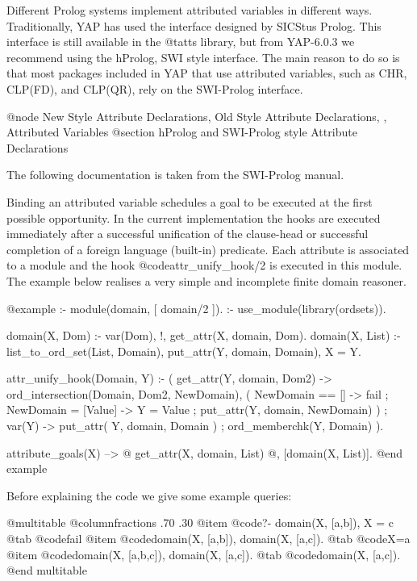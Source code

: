 {{{{{{{{Different Prolog systems implement attributed variables in different
ways. Traditionally, YAP has used the interface designed by SICStus
Prolog. This interface is still
available in the @t{atts} library, but from YAP-6.0.3 we recommend using
the hProlog, SWI style interface. The main reason to do so is that 
most packages included in YAP that use attributed variables, such as CHR, CLP(FD), and CLP(QR),
rely on the SWI-Prolog interface.


@node New Style Attribute Declarations, Old Style Attribute Declarations, , Attributed Variables
@section hProlog and SWI-Prolog style Attribute Declarations

The following documentation is taken from the SWI-Prolog manual.

Binding an attributed variable schedules a goal to be executed at the
first possible opportunity. In the current implementation the hooks are
executed immediately after a successful unification of the clause-head
or successful completion of a foreign language (built-in) predicate. Each
attribute is associated to a module and the hook @code{attr_unify_hook/2} is
executed in this module.  The example below realises a very simple and
incomplete finite domain reasoner.

@example
:- module(domain,
	  [ domain/2			%
	  ]).
:- use_module(library(ordsets)).

domain(X, Dom) :-
	var(Dom), !,
	get_attr(X, domain, Dom).
domain(X, List) :-
	list_to_ord_set(List, Domain),
	put_attr(Y, domain, Domain),
	X = Y.


attr_unify_hook(Domain, Y) :-
	(   get_attr(Y, domain, Dom2)
	->  ord_intersection(Domain, Dom2, NewDomain),
	    (   NewDomain == []
	    ->	fail
	    ;	NewDomain = [Value]
	    ->	Y = Value
	    ;	put_attr(Y, domain, NewDomain)
	    )
	;   var(Y)
	->  put_attr( Y, domain, Domain )
	;   ord_memberchk(Y, Domain)
	).


attribute_goals(X) -->
	@{ get_attr(X, domain, List) @},
	[domain(X, List)].
@end example


Before explaining the code we give some example queries:

@multitable @columnfractions .70 .30
            @item @code{?- domain(X, [a,b]), X = c}
@tab @code{fail}
@item @code{domain(X, [a,b]), domain(X, [a,c]).}
           @tab @code{X=a}
    @item @code{domain(X, [a,b,c]), domain(X, [a,c]).}
     @tab @code{domain(X, [a,c]).}
    @end multitable

}}}}}}}}

